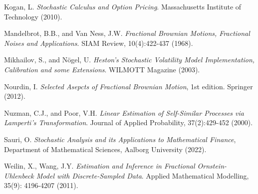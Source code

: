 \documentclass[11pt,a4paper,twoside,openright,english]{book}
\begin{document}
\begin{thebibliography}{}
Kogan, L. \textit{Stochastic Calculus and Option Pricing}. Massachusetts Institute of Technology (2010).

Mandelbrot, B.B., and Van Ness, J.W. \textit{Fractional Brownian Motions, Fractional Noises and Applications}. SIAM Review, 10(4):422-437 (1968).

Mikhailov, S., and Nögel, U. \textit{Heston's Stochastic Volatility Model Implementation, Calibration and some Extensions}. WILMOTT Magazine (2003).

Nourdin, I. \textit{Selected Asepcts of Fractional Brownian Motion}, 1st edition. Springer (2012).

Nuzman, C.J., and Poor, V.H. \textit{Linear Estimation of Self-Similar Processes via Lamperti's Transformation}. Journal of Applied Probability, 37(2):429-452 (2000).

Sauri, O. \textit{Stochastic Analysis and its Applications to Mathematical Finance}, Department of Mathematical Sciences, Aalborg University (2022).

Weilin, X., Wang, J.Y. \textit{Estimation and Inference in Fractional Ornstein-Uhlenbeck Model with Discrete-Sampled Data}. Applied Mathematical Modelling, 35(9): 4196-4207 (2011).
\end{thebibliography}{}
\end{document}

